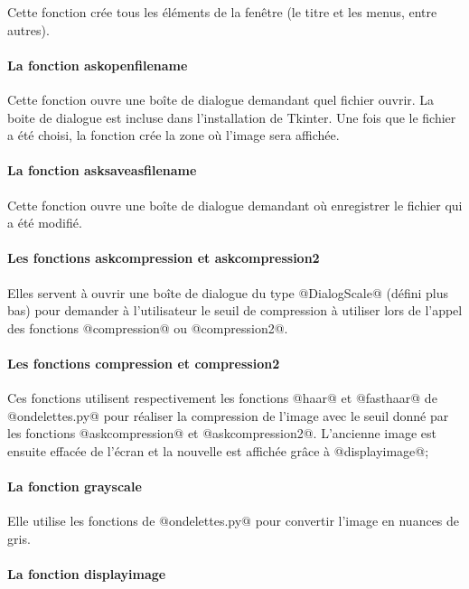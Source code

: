 \documentclass{article}
\begin{document}
Cette fonction crée tous les éléments de la fenêtre (le titre et les menus, entre autres).

\paragraph{La fonction askopenfilename}

Cette fonction ouvre une boîte de dialogue demandant quel fichier ouvrir. La boite de dialogue est incluse dans l'installation de Tkinter.
Une fois que le fichier a été choisi, la fonction crée la zone où l'image sera affichée.

\paragraph{La fonction asksaveasfilename}

Cette fonction ouvre une boîte de dialogue demandant où enregistrer le fichier qui a été modifié.

\paragraph{Les fonctions askcompression et askcompression2}

Elles servent à ouvrir une boîte de dialogue du type @DialogScale@ (défini plus bas) pour demander à l'utilisateur le seuil de compression à utiliser lors de l'appel des fonctions @compression@ ou @compression2@.

\paragraph{Les fonctions compression et compression2}

Ces fonctions utilisent respectivement les fonctions @haar@ et @fasthaar@ de @ondelettes.py@ pour réaliser la compression de l'image avec le seuil donné par les fonctions @askcompression@ et @askcompression2@. L'ancienne image est ensuite effacée de l'écran et la nouvelle est affichée grâce à @displayimage@;

\paragraph{La fonction grayscale}

Elle utilise les fonctions de @ondelettes.py@ pour convertir l'image en nuances de gris.

\paragraph{La fonction displayimage}
\end{document}

